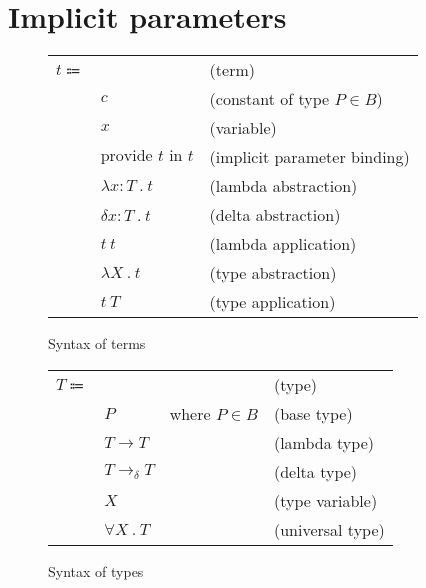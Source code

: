 \documentclass[acmlarge]{acmart}
\begin{document}
\section{Implicit parameters}

  \newcommand\entails[2]{#1 \vdash #2}
  \newcommand\hastype[2]{#1 : #2}
  \newcommand\upsert[3]{#1 \otimes \left( #2 \hookrightarrow #3 \right)}
  \newcommand\lookup[3]{\upsert{#1}{#2}{#3}}
  \newcommand\evalsto[2]{#1 \longrightarrow #2}

  \newcommand\labs[2]{\lambda #1 \ . \ #2}
  \newcommand\dabs[2]{\delta #1 \ . \ #2}
  \newcommand\app[2]{#1 \ #2}
  \newcommand\sub[3]{#1 \left[ #2 \mapsto #3 \right]}
  \newcommand\provide[2]{\text{provide } #1 \text{ in } #2}

  \newcommand\larrow[2]{#1 \rightarrow #2}
  \newcommand\darrow[2]{#1 \rightarrow_{\delta} #2}
  \newcommand\tabs[2]{\forall #1 \ . \ #2}

  \begin{figure}[h!]
    \begin{mdframed}

      \begin{tabular}{l l l}
        $t \Coloneqq $ & & (term) \\
        & $c$ & (constant of type $P \in B$) \\
        & $x$ & (variable) \\
        & $\provide{t}{t}$ & (implicit parameter binding) \\
        & $\labs{\hastype{x}{T}}{t}$ & (lambda abstraction) \\
        & $\dabs{\hastype{x}{T}}{t}$ & (delta abstraction) \\
        & $\app{t}{t}$ & (lambda application) \\
        & $\labs{X}{t}$ & (type abstraction) \\
        & $\app{t}{T}$ & (type application) \\
      \end{tabular}

    \end{mdframed}
    \caption{Syntax of terms}
    \label{fig:terms_syntax}
  \end{figure}

  \begin{figure}[h!]
    \begin{mdframed}

      \begin{tabular}{l l l l}
        $T \Coloneqq $ & & & (type) \\
        & $P$ & where $P \in B$ & (base type) \\
        & $\larrow{T}{T}$ & & (lambda type) \\
        & $\darrow{T}{T}$ & & (delta type) \\
        & $X$ & & (type variable) \\
        & $\tabs{X}{T}$ & & (universal type) \\
      \end{tabular}

    \end{mdframed}
    \caption{Syntax of types}
    \label{fig:types_syntax}
  \end{figure}
\end{document}
